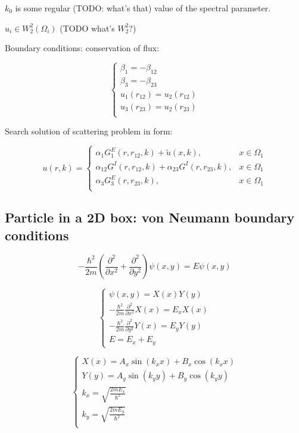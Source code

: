 \documentclass[12pt, a4paper]{article}
\begin{document}
$k_0$ is some regular (TODO: what's that) value of the spectral parameter.

$u_i \in W_2^2(\Omega_i)$ (TODO what's $W_2^2$?)

Boundary conditions: conservation of flux:

$$\begin{cases}
\beta_1 = - \beta_{12} \\
\beta_3 = - \beta_{23} \\
u_1(r_{12}) = u_2(r_{12}) \\
u_3(r_{23}) = u_2(r_{23}) \\
\end{cases}$$

Search solution of scattering problem in form:

$$u(r, k) = \begin{cases}
\alpha_1 G^E_1(r, r_{12}, k) + {\tilde u}(x, k), & x \in \Omega_1 \\
\alpha_{12} G^I(r, r_{12}, k) + \alpha_{23} G^I(r, r_{23}, k), & x \in \Omega_1 \\
\alpha_3 G^E_3(r, r_{23}, k), & x \in \Omega_1 \\
\end{cases}$$

\subsection{Particle in a 2D box: von Neumann boundary conditions}

$$-\frac{\hbar^2}{2 m} \left( \frac{\partial^2}{\partial x^2} + \frac{\partial^2}{\partial y^2} \right) \psi(x, y) = E \psi(x, y) $$

$$\begin{cases}
\psi(x, y) = X(x) Y(y) \\
- \frac{\hbar^2}{2 m} \frac{\partial^2}{\partial x^2} X(x) = E_x X(x) \\
- \frac{\hbar^2}{2 m} \frac{\partial^2}{\partial y^2} Y(x) = E_y Y(y) \\
E = E_x + E_y
\end{cases}$$

$$\begin{cases}
X(x) = A_x \sin(k_x x) + B_x \cos(k_x x) \\
Y(y) = A_y \sin(k_y y) + B_y \cos(k_y y) \\
k_x = \sqrt{\frac{2 m E_x}{\hbar^2}} \\
k_y = \sqrt{\frac{2 m E_y}{\hbar^2}} \\
\end{cases}$$
\end{document}
